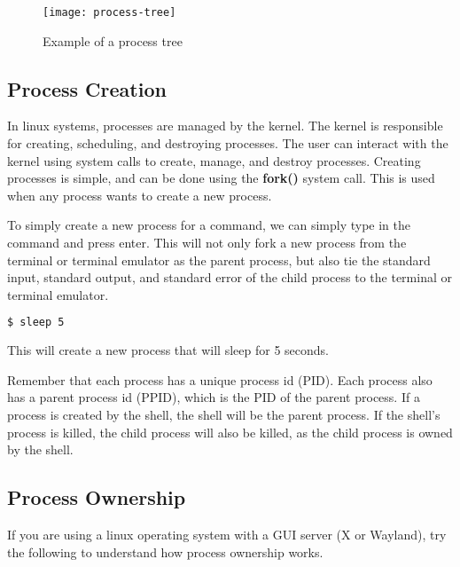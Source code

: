 \begin{figure}[h!]
  \texttt{[image: process-tree]}
  \caption{Example of a process tree}
\end{figure}

\subsection{Process Creation}
In linux systems, processes are managed by the kernel.
The kernel is responsible for creating, scheduling, and destroying processes.
The user can interact with the kernel using system calls to create, manage, and destroy processes.
Creating processes is simple, and can be done using the \textbf{fork()} system call.
This is used when any process wants to create a new process.

To simply create a new process for a command,
we can simply type in the command and press enter.
This will not only fork a new process from the terminal or
terminal emulator as the parent process, but also tie the
standard input, standard output, and standard error of the child process
to the terminal or terminal emulator.

\begin{lstlisting}[language=bash]
$ sleep 5
\end{lstlisting}

This will create a new process that will sleep for 5 seconds.

Remember that each process has a unique process id (PID).
Each process also has a parent process id (PPID),
which is the PID of the parent process.
If a process is created by the shell, the shell will be the parent process.
If the shell's process is killed, the child process will also
be killed, as the child process is owned by the shell.

\subsection{Process Ownership}

If you are using a linux operating system with a GUI server (X or Wayland),
try the following to understand how process ownership works.

